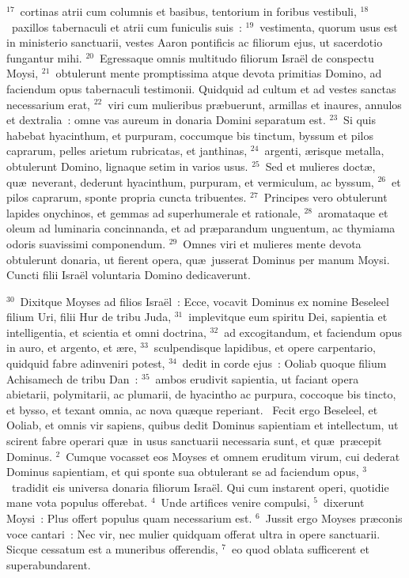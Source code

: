 ${}^{17}$~cortinas atrii cum columnis et basibus, tentorium in foribus vestibuli,
${}^{18}$~paxillos tabernaculi et atrii cum funiculis suis~:
${}^{19}$~vestimenta, quorum usus est in ministerio sanctuarii, vestes Aaron pontificis ac filiorum ejus, ut sacerdotio fungantur mihi.
${}^{20}$~Egressaque omnis multitudo filiorum Isra\"el de conspectu Moysi,
${}^{21}$~obtulerunt mente promptissima atque devota primitias Domino, ad faciendum opus tabernaculi testimonii. Quidquid ad cultum et ad vestes sanctas necessarium erat,
${}^{22}$~viri cum mulieribus pr\ae buerunt, armillas et inaures, annulos et dextralia~: omne vas aureum in donaria Domini separatum est.
${}^{23}$~Si quis habebat hyacinthum, et purpuram, coccumque bis tinctum, byssum et pilos caprarum, pelles arietum rubricatas, et janthinas,
${}^{24}$~argenti, \ae risque metalla, obtulerunt Domino, lignaque setim in varios usus.
${}^{25}$~Sed et mulieres doct\ae , qu\ae\ neverant, dederunt hyacinthum, purpuram, et vermiculum, ac byssum,
${}^{26}$~et pilos caprarum, sponte propria cuncta tribuentes.
${}^{27}$~Principes vero obtulerunt lapides onychinos, et gemmas ad superhumerale et rationale,
${}^{28}$~aromataque et oleum ad luminaria concinnanda, et ad pr\ae parandum unguentum, ac thymiama odoris suavissimi componendum.
${}^{29}$~Omnes viri et mulieres mente devota obtulerunt donaria, ut fierent opera, qu\ae\ jusserat Dominus per manum Moysi. Cuncti filii Isra\"el voluntaria Domino dedicaverunt.


${}^{30}$~Dixitque Moyses ad filios Isra\"el~: Ecce, vocavit Dominus ex nomine Beseleel filium Uri, filii Hur de tribu Juda,
${}^{31}$~implevitque eum spiritu Dei, sapientia et intelligentia, et scientia et omni doctrina,
${}^{32}$~ad excogitandum, et faciendum opus in auro, et argento, et \ae re,
${}^{33}$~sculpendisque lapidibus, et opere carpentario, quidquid fabre adinveniri potest,
${}^{34}$~dedit in corde ejus~: Ooliab quoque filium Achisamech de tribu Dan~:
${}^{35}$~ambos erudivit sapientia, ut faciant opera abietarii, polymitarii, ac plumarii, de hyacintho ac purpura, coccoque bis tincto, et bysso, et texant omnia, ac nova qu\ae que reperiant.
~Fecit ergo Beseleel, et Ooliab, et omnis vir sapiens, quibus dedit Dominus sapientiam et intellectum, ut scirent fabre operari qu\ae\ in usus sanctuarii necessaria sunt, et qu\ae\ pr\ae cepit Dominus.
${}^{2}$~Cumque vocasset eos Moyses et omnem eruditum virum, cui dederat Dominus sapientiam, et qui sponte sua obtulerant se ad faciendum opus,
${}^{3}$~tradidit eis universa donaria filiorum Isra\"el. Qui cum instarent operi, quotidie mane vota populus offerebat.
${}^{4}$~Unde artifices venire compulsi,
${}^{5}$~dixerunt Moysi~: Plus offert populus quam necessarium est.
${}^{6}$~Jussit ergo Moyses pr\ae conis voce cantari~: Nec vir, nec mulier quidquam offerat ultra in opere sanctuarii. Sicque cessatum est a muneribus offerendis,
${}^{7}$~eo quod oblata sufficerent et superabundarent.


